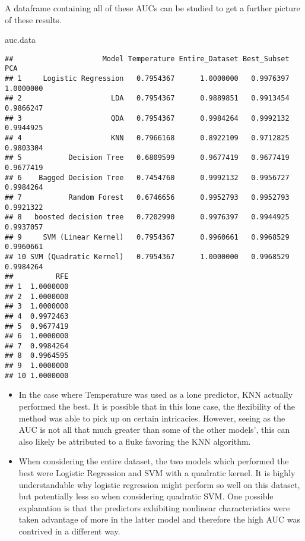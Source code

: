 \documentclass[
]{article}
\newenvironment{Shaded}{\begin{snugshade}}{\end{snugshade}}
\newcommand{\NormalTok}[1]{#1}
\begin{document}
A dataframe containing all of these AUCs can be studied to get a further
picture of these results.

\begin{Shaded}
\begin{Highlighting}[]
\NormalTok{auc.data}
\end{Highlighting}
\end{Shaded}

\begin{verbatim}
##                     Model Temperature Entire_Dataset Best_Subset       PCA
## 1     Logistic Regression   0.7954367      1.0000000   0.9976397 1.0000000
## 2                     LDA   0.7954367      0.9889851   0.9913454 0.9866247
## 3                     QDA   0.7954367      0.9984264   0.9992132 0.9944925
## 4                     KNN   0.7966168      0.8922109   0.9712825 0.9803304
## 5           Decision Tree   0.6809599      0.9677419   0.9677419 0.9677419
## 6    Bagged Decision Tree   0.7454760      0.9992132   0.9956727 0.9984264
## 7           Random Forest   0.6746656      0.9952793   0.9952793 0.9921322
## 8   boosted decision tree   0.7202990      0.9976397   0.9944925 0.9937057
## 9     SVM (Linear Kernel)   0.7954367      0.9960661   0.9968529 0.9960661
## 10 SVM (Quadratic Kernel)   0.7954367      1.0000000   0.9968529 0.9984264
##          RFE
## 1  1.0000000
## 2  1.0000000
## 3  1.0000000
## 4  0.9972463
## 5  0.9677419
## 6  1.0000000
## 7  0.9984264
## 8  0.9964595
## 9  1.0000000
## 10 1.0000000
\end{verbatim}

\begin{itemize}
\item
  In the case where Temperature was used as a lone predictor, KNN
  actually performed the best. It is possible that in this lone case,
  the flexibility of the method was able to pick up on certain
  intricacies. However, seeing as the AUC is not all that much greater
  than some of the other models', this can also likely be attributed to
  a fluke favoring the KNN algorithm.
\item
  When considering the entire dataset, the two models which performed
  the best were Logistic Regression and SVM with a quadratic kernel. It
  is highly understandable why logistic regression might perform so well
  on this dataset, but potentially less so when considering quadratic
  SVM. One possible explanation is that the predictors exhibiting
  nonlinear characteristics were taken advantage of more in the latter
  model and therefore the high AUC was contrived in a different way.
\end{itemize}
\end{document}
